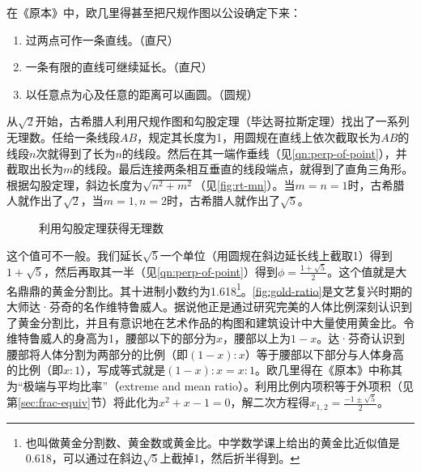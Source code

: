 \documentclass[b5paper]{ctexart}
\begin{document}
在《原本》中，欧几里得甚至把尺规作图以公设确定下来：
\begin{enumerate}[(公设1)]
\item 过两点可作一条直线。（直尺）
\item 一条有限的直线可继续延长。（直尺）
\item 以任意点为心及任意的距离可以画圆。（圆规）
\end{enumerate}

从$\sqrt{2}$开始，古希腊人利用尺规作图和勾股定理（毕达哥拉斯定理）找出了一系列无理数。任给一条线段$AB$，规定其长度为1，用圆规在直线上依次截取长为$AB$的线段$n$次就得到了长为$n$的线段。然后在其一端作垂线（见\cref{qn:perp-of-point}），并截取出长为$m$的线段。最后连接两条相互垂直的线段端点，就得到了直角三角形。根据勾股定理，斜边长度为$\sqrt{n^2 + m^2}$（见\cref{fig:rt-mn}）。当$m = n = 1$时，古希腊人就作出了$\sqrt{2}$，当$m=1, n=2$时，古希腊人就作出了$\sqrt{5}$。

\begin{figure}[htbp]
  \centering
  \caption{利用勾股定理获得无理数}
  \label{fig:irrational-tagent}
\end{figure}

 
这个值可不一般。我们延长$\sqrt{5}$一个单位（用圆规在斜边延长线上截取1）得到$1 + \sqrt{5}$，然后再取其一半（见\cref{qn:perp-of-point}）得到$\phi = \frac{1 + \sqrt{5}}{2}$。这个值就是大名鼎鼎的黄金分割比。其十进制小数约为1.618\footnote{也叫做黄金分割数、黄金数或黄金比。中学数学课上给出的黄金比近似值是0.618，可以通过在斜边$\sqrt{5}$上截掉1，然后折半得到。}。\cref{fig:gold-ratio}是文艺复兴时期的大师达·芬奇的名作维特鲁威人。据说他正是通过研究完美的人体比例深刻认识到了黄金分割比，并且有意识地在艺术作品的构图和建筑设计中大量使用黄金比。令维特鲁威人的身高为1，腰部以下的部分为$x$，腰部以上为$1 - x$。达·芬奇认识到腰部将人体分割为两部分的比例（即$(1 - x) : x$）等于腰部以下部分与人体身高的比例（即$x : 1$），写成等式就是$(1 - x) : x = x : 1$。欧几里得在《原本》中称其为“极端与平均比率”（extreme and mean ratio）。利用比例内项积等于外项积（见第\ref{sec:frac-equiv}节）将此化为$x^2 + x - 1 = 0$，解二次方程得$x_{1, 2} = \frac{-1 \pm \sqrt{5}}{2}$。
\end{document}
